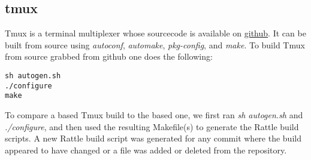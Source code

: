 




\subsection{tmux}



Tmux is a terminal multiplexer whose sourcecode is available on  \href{``https://github.com/vim/vim''}{github}.  It can be built from source using \emph{autoconf}, \emph{automake}, \emph{pkg-config}, and \emph{make}.  To build Tmux from source grabbed from github one does the following:

\begin{verbatim}
sh autogen.sh
./configure
make
\end{verbatim}

To compare a \Rattle based Tmux build to the \Make based one, we first ran \emph{sh autogen.sh} and \emph{./configure}, and then used the resulting Makefile(s) to generate the Rattle build scripts.  A new Rattle build script was generated for any commit where the build appeared to have changed or a file was added or deleted from the repository.

